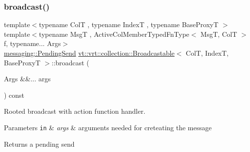 \mbox{\label{structvt_1_1vrt_1_1collection_1_1_broadcastable_a96cd21a1be6313144a8c4aa3683eaa05}} 
\subsubsection{\texorpdfstring{broadcast()}{broadcast()}\hspace{0.1cm}{\footnotesize\ttfamily [3/6]}}
{\footnotesize\ttfamily template$<$typename ColT , typename IndexT , typename Base\+ProxyT $>$ \\
template$<$typename MsgT , Active\+Col\+Member\+Typed\+Fn\+Type$<$ Msg\+T, Col\+T $>$ f, typename... Args$>$ \\
\hyperlink{structvt_1_1messaging_1_1_pending_send}{messaging\+::\+Pending\+Send} \hyperlink{structvt_1_1vrt_1_1collection_1_1_broadcastable}{vt\+::vrt\+::collection\+::\+Broadcastable}$<$ ColT, IndexT, Base\+ProxyT $>$\+::broadcast (\begin{DoxyParamCaption}\item[{Args \&\&...}]{args }\end{DoxyParamCaption}) const}



Rooted broadcast with action function handler. 


\begin{DoxyParams}[1]{Parameters}
\mbox{\tt in}  & {\em args} & arguments needed for creteating the message\\
\hline
\end{DoxyParams}
\begin{DoxyReturn}{Returns}
a pending send 
\end{DoxyReturn}
\mbox{\label{structvt_1_1vrt_1_1collection_1_1_broadcastable_a0a08e1ab7c78e36b3ecb5b6a4d399dab}} 
